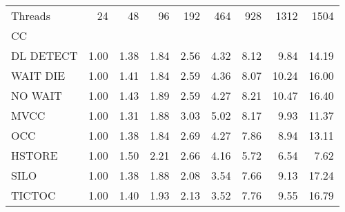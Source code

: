 \begin{tabular}{lrrrrrrrr}
\toprule
Threads &  24   &  48   &  96   &  192  &  464  &  928  &  1312 &  1504 \\
CC        &       &       &       &       &       &       &       &       \\
\midrule
DL DETECT &  1.00 &  1.38 &  1.84 &  2.56 &  4.32 &  8.12 &  9.84 & 14.19 \\
WAIT DIE  &  1.00 &  1.41 &  1.84 &  2.59 &  4.36 &  8.07 & 10.24 & 16.00 \\
NO WAIT   &  1.00 &  1.43 &  1.89 &  2.59 &  4.27 &  8.21 & 10.47 & 16.40 \\
MVCC      &  1.00 &  1.31 &  1.88 &  3.03 &  5.02 &  8.17 &  9.93 & 11.37 \\
OCC       &  1.00 &  1.38 &  1.84 &  2.69 &  4.27 &  7.86 &  8.94 & 13.11 \\
HSTORE    &  1.00 &  1.50 &  2.21 &  2.66 &  4.16 &  5.72 &  6.54 &  7.62 \\
SILO      &  1.00 &  1.38 &  1.88 &  2.08 &  3.54 &  7.66 &  9.13 & 17.24 \\
TICTOC    &  1.00 &  1.40 &  1.93 &  2.13 &  3.52 &  7.76 &  9.55 & 16.79 \\
\bottomrule
\end{tabular}
